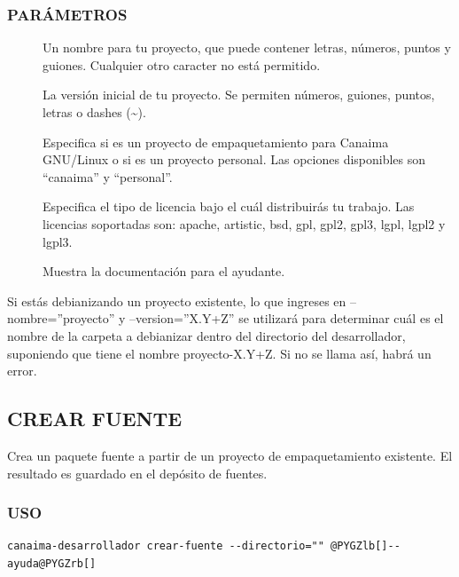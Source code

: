 \documentclass[letterpaper,12pt,spanish]{manual}
\begin{document}
\subsubsection{PARÁMETROS}
\begin{description}
\item[{}] \leavevmode
Un nombre para tu proyecto, que puede contener letras, números, puntos y guiones. Cualquier otro caracter no está permitido.

\item[{}] \leavevmode
La versión inicial de tu proyecto. Se permiten números, guiones, puntos, letras o dashes (\textasciitilde{}).

\item[{}] \leavevmode
Especifica si es un proyecto de empaquetamiento para Canaima GNU/Linux o si es un proyecto personal. Las opciones disponibles son ``canaima'' y ``personal''.

\item[{}] \leavevmode
Especifica el tipo de licencia bajo el cuál distribuirás tu trabajo. Las licencias soportadas son: apache, artistic, bsd, gpl, gpl2, gpl3, lgpl, lgpl2 y lgpl3.

\item[{}] \leavevmode
Muestra la documentación para el ayudante.

\end{description}

Si estás debianizando un proyecto existente, lo que ingreses en --nombre=''proyecto'' y --version=''X.Y+Z'' se utilizará para determinar cuál es el nombre de la carpeta a debianizar dentro del directorio del desarrollador, suponiendo que tiene el nombre proyecto-X.Y+Z. Si no se llama así, habrá un error.


\subsection{\textbf{CREAR FUENTE}}

Crea un paquete fuente a partir de un proyecto de empaquetamiento existente. El resultado es guardado en el depósito de fuentes.


\subsubsection{USO}

\begin{Verbatim}[commandchars=@\[\]]
canaima-desarrollador crear-fuente --directorio="" @PYGZlb[]--ayuda@PYGZrb[]
\end{Verbatim}
\end{document}

